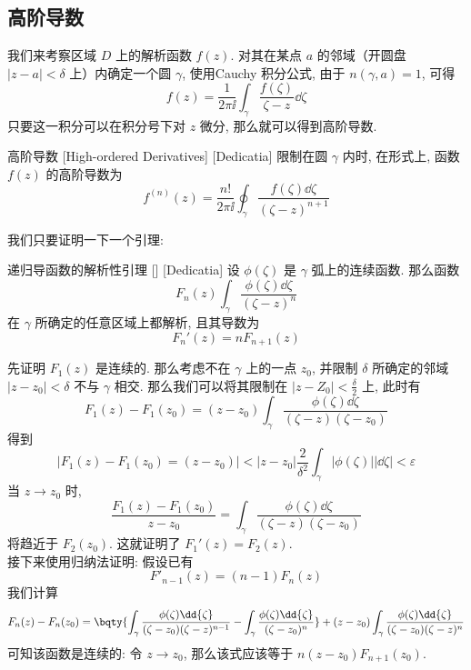 \documentclass[UTF8]{ctexart}
\begin{document}
    \subsection{高阶导数}

        我们来考察区域 \(D\) 上的解析函数 \(f(z)\). 对其在某点 \(a\) 的邻域（开圆盘 \(|z-a|<\delta\) 上）内确定一个圆 \(\gamma\), 使用Cauchy 积分公式, 由于 \(n(\gamma,a)=1\), 可得
        \[f(z)=\frac{1}{2\pi\ii}\int_\gamma\frac{f(\zeta)}{\zeta-z}\dd{\zeta}\]
        只要这一积分可以在积分号下对 \(z\) 微分, 那么就可以得到高阶导数. 

        \begin{dfn}
            [HighOrderedDerivative]
            {高阶导数}
            [High-ordered Derivatives]
            [Dedicatia]
            限制在圆 \(\gamma\) 内时, 在形式上, 函数 \(f(z)\) 的高阶导数为
            \[f^{(n)}(z)=\frac{n!}{2\pi\ii}\oint_\gamma\frac{f(\zeta)\dd{\zeta}}{(\zeta-z)^{n+1}}\]
        \end{dfn}

        我们只要证明一下一个引理: 

        \begin{lma}
            [UUID]
            {递归导函数的解析性引理}
            []
            [Dedicatia]
            设 \(\phi(\zeta)\) 是 \(\gamma\) 弧上的连续函数. 那么函数
            \[F_n(z)\int_\gamma \frac{\phi(\zeta)\dd{\zeta}}{(\zeta-z)^n}\]
            在 \(\gamma\) 所确定的任意区域上都解析, 且其导数为
            \[F_n'(z)=nF_{n+1}(z)\]
        \end{lma}

        \begin{prf}
            先证明 \(F_1(z)\) 是连续的. 那么考虑不在 \(\gamma\) 上的一点 \(z_0\), 并限制 \(\delta\) 所确定的邻域 \(|z-z_0|<\delta\) 不与 \(\gamma\) 相交. 那么我们可以将其限制在 \(|z-Z_0|<\frac{\delta}{2}\) 上, 此时有
            \[F_1(z)-F_1(z_0)=(z-z_0)\int_\gamma\frac{\phi(\zeta)\dd{\zeta}}{(\zeta-z)(\zeta-z_0)}\]
            得到
            \[|F_1(z)-F_1(z_0)=(z-z_0)|<|z-z_0|\frac{2}{\delta^2}\int_\gamma|\phi(\zeta)||\dd{\zeta}|<\varepsilon\]
            当 \(z\to z_0\) 时, 
            \[\frac{F_1(z)-F_1(z_0)}{z-z_0}=\int_\gamma\frac{\phi(\zeta)\dd{\zeta}}{(\zeta-z)(\zeta-z_0)}\]
            将趋近于 \(F_2(z_0)\). 这就证明了 \(F_1'(z)=F_2(z) \).\\
            接下来使用归纳法证明: 假设已有
            \[F'_{n-1}(z)=(n-1)F_n(z)\]
            我们计算
            \[F_n(z)-F_n(z_0)=\bqty{\int_\gamma\frac{\phi(\zeta)\dd{\zeta}}{(\zeta-z_0)(\zeta-z)^{n-1}}-\int_\gamma\frac{\phi(\zeta)\dd{\zeta}}{(\zeta-z_0)^n}}+(z-z_0)\int_\gamma\frac{\phi(\zeta)\dd{\zeta}}{(\zeta-z_0)(\zeta-z)^{n}}\]
            可知该函数是连续的: 令 \(z\to z_0\), 那么该式应该等于 \(n(z-z_0)F_{n+1}(z_0)\).
        \end{prf}
\end{document}
